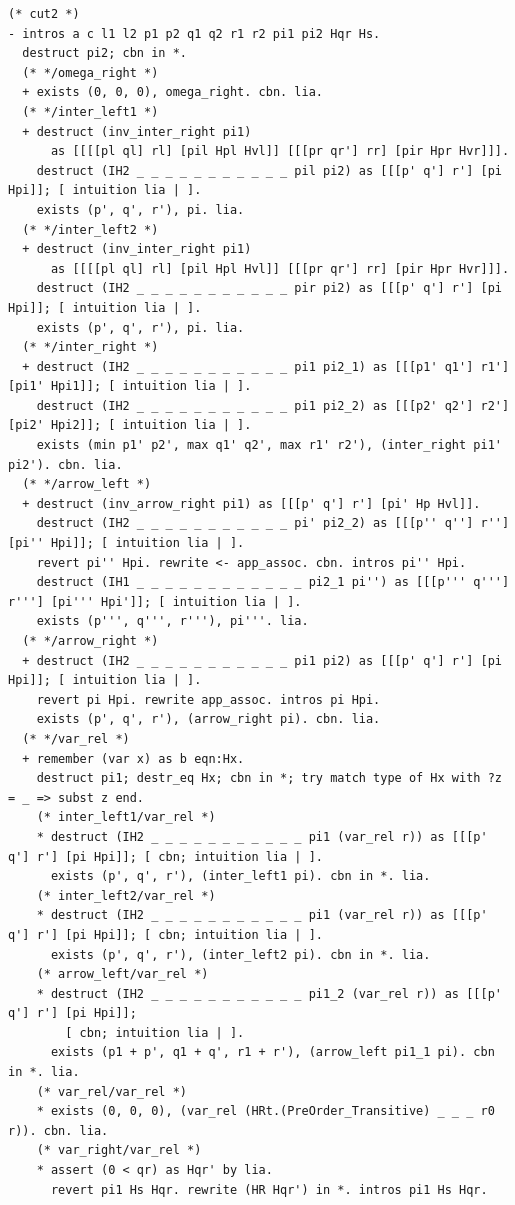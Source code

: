 \begin{lstlisting}
(* cut2 *)
- intros a c l1 l2 p1 p2 q1 q2 r1 r2 pi1 pi2 Hqr Hs.
  destruct pi2; cbn in *.
  (* */omega_right *)
  + exists (0, 0, 0), omega_right. cbn. lia.
  (* */inter_left1 *)
  + destruct (inv_inter_right pi1)
      as [[[[pl ql] rl] [pil Hpl Hvl]] [[[pr qr'] rr] [pir Hpr Hvr]]].
    destruct (IH2 _ _ _ _ _ _ _ _ _ _ _ pil pi2) as [[[p' q'] r'] [pi Hpi]]; [ intuition lia | ].
    exists (p', q', r'), pi. lia.
  (* */inter_left2 *)
  + destruct (inv_inter_right pi1)
      as [[[[pl ql] rl] [pil Hpl Hvl]] [[[pr qr'] rr] [pir Hpr Hvr]]].
    destruct (IH2 _ _ _ _ _ _ _ _ _ _ _ pir pi2) as [[[p' q'] r'] [pi Hpi]]; [ intuition lia | ].
    exists (p', q', r'), pi. lia.
  (* */inter_right *)
  + destruct (IH2 _ _ _ _ _ _ _ _ _ _ _ pi1 pi2_1) as [[[p1' q1'] r1'] [pi1' Hpi1]]; [ intuition lia | ].
    destruct (IH2 _ _ _ _ _ _ _ _ _ _ _ pi1 pi2_2) as [[[p2' q2'] r2'] [pi2' Hpi2]]; [ intuition lia | ].
    exists (min p1' p2', max q1' q2', max r1' r2'), (inter_right pi1' pi2'). cbn. lia.
  (* */arrow_left *)
  + destruct (inv_arrow_right pi1) as [[[p' q'] r'] [pi' Hp Hvl]].
    destruct (IH2 _ _ _ _ _ _ _ _ _ _ _ pi' pi2_2) as [[[p'' q''] r''] [pi'' Hpi]]; [ intuition lia | ].
    revert pi'' Hpi. rewrite <- app_assoc. cbn. intros pi'' Hpi.
    destruct (IH1 _ _ _ _ _ _ _ _ _ _ _ _ pi2_1 pi'') as [[[p''' q'''] r'''] [pi''' Hpi']]; [ intuition lia | ].
    exists (p''', q''', r'''), pi'''. lia.
  (* */arrow_right *)
  + destruct (IH2 _ _ _ _ _ _ _ _ _ _ _ pi1 pi2) as [[[p' q'] r'] [pi Hpi]]; [ intuition lia | ].
    revert pi Hpi. rewrite app_assoc. intros pi Hpi.
    exists (p', q', r'), (arrow_right pi). cbn. lia.
  (* */var_rel *)
  + remember (var x) as b eqn:Hx.
    destruct pi1; destr_eq Hx; cbn in *; try match type of Hx with ?z = _ => subst z end.
    (* inter_left1/var_rel *)
    * destruct (IH2 _ _ _ _ _ _ _ _ _ _ _ pi1 (var_rel r)) as [[[p' q'] r'] [pi Hpi]]; [ cbn; intuition lia | ].
      exists (p', q', r'), (inter_left1 pi). cbn in *. lia.
    (* inter_left2/var_rel *)
    * destruct (IH2 _ _ _ _ _ _ _ _ _ _ _ pi1 (var_rel r)) as [[[p' q'] r'] [pi Hpi]]; [ cbn; intuition lia | ].
      exists (p', q', r'), (inter_left2 pi). cbn in *. lia.
    (* arrow_left/var_rel *)
    * destruct (IH2 _ _ _ _ _ _ _ _ _ _ _ pi1_2 (var_rel r)) as [[[p' q'] r'] [pi Hpi]];
        [ cbn; intuition lia | ].
      exists (p1 + p', q1 + q', r1 + r'), (arrow_left pi1_1 pi). cbn in *. lia.
    (* var_rel/var_rel *)
    * exists (0, 0, 0), (var_rel (HRt.(PreOrder_Transitive) _ _ _ r0 r)). cbn. lia.
    (* var_right/var_rel *)
    * assert (0 < qr) as Hqr' by lia.
      revert pi1 Hs Hqr. rewrite (HR Hqr') in *. intros pi1 Hs Hqr.

\end{lstlisting}
